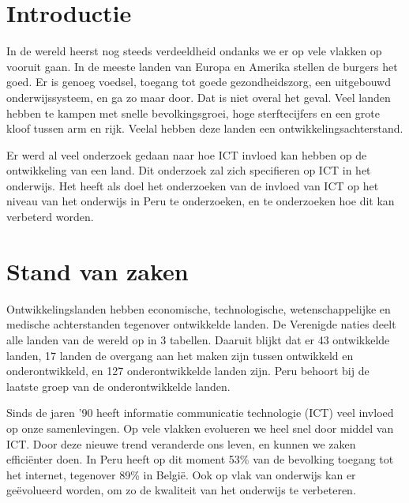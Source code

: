 

\section{Introductie} %
\label{sec:introductie}

In de wereld heerst nog steeds  verdeeldheid ondanks we er op vele vlakken op vooruit gaan. In de meeste landen van  Europa en Amerika stellen de burgers het goed. Er is genoeg voedsel, toegang tot goede gezondheidszorg, een uitgebouwd onderwijssysteem, en ga zo maar door. Dat is niet overal het geval. Veel landen hebben te kampen met snelle bevolkingsgroei, hoge sterftecijfers en een grote kloof tussen arm en rijk. Veelal hebben deze landen een ontwikkelingsachterstand. 

Er werd al veel onderzoek gedaan naar hoe ICT invloed kan hebben op de ontwikkeling van een land. Dit onderzoek zal zich specifieren op ICT in het onderwijs. Het heeft als doel het onderzoeken van de invloed van ICT op het niveau van het onderwijs in Peru te onderzoeken, en te onderzoeken hoe dit kan verbeterd worden. 


\section{Stand van zaken}
\label{sec:state-of-the-art}
Ontwikkelingslanden hebben economische, technologische, wetenschappelijke en medische achterstanden tegenover ontwikkelde landen. De Verenigde naties deelt alle landen van de wereld op in 3 tabellen. Daaruit blijkt dat er 43 ontwikkelde landen, 17 landen de overgang aan het maken zijn tussen ontwikkeld en onderontwikkeld, en 127 onderontwikkelde landen zijn. \autocite{Nations2019} Peru behoort bij de laatste groep van de onderontwikkelde landen. 

Sinds de jaren '90 heeft informatie communicatie technologie (ICT) veel invloed op onze samenlevingen. Op vele vlakken evolueren we heel snel door middel van ICT. Door deze nieuwe trend veranderde ons leven, en kunnen we zaken  effici\"enter doen. In Peru heeft op dit moment 53\% van de bevolking toegang tot het internet, tegenover 89\% in Belgi\"e. \autocite{ITU2018} Ook op vlak van onderwijs kan er ge\"evolueerd worden, om zo de kwaliteit van het onderwijs te verbeteren.

